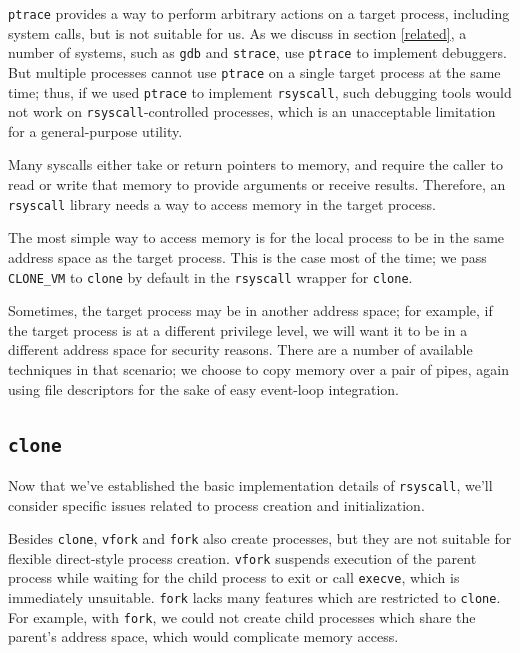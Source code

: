 \documentclass[letterpaper,twocolumn,10pt]{article}
\begin{document}
\texttt{ptrace} provides a way to perform arbitrary actions on a target process,
including system calls,
but is not suitable for us.\cite{ptrace}
As we discuss in section \ref{related}, a number of systems, such as \texttt{gdb} and \texttt{strace},
use \texttt{ptrace} to implement debuggers.
But multiple processes cannot use \texttt{ptrace} on a single target process at the same time;
thus, if we used \texttt{ptrace} to implement \texttt{rsyscall},
such debugging tools would not work on \texttt{rsyscall}-controlled processes,
which is an unacceptable limitation for a general-purpose utility.

Many syscalls either take or return pointers to memory,
and require the caller to read or write that memory to provide arguments or receive results.
Therefore, an \texttt{rsyscall} library needs a way to access memory in the target process.

The most simple way to access memory is for the local process to be in the same address space as the target process.
This is the case most of the time; we pass \verb|CLONE_VM| to \texttt{clone} by default
in the \texttt{rsyscall} wrapper for \texttt{clone}.

Sometimes, the target process may be in another address space;
for example, if the target process is at a different privilege level,
we will want it to be in a different address space for security reasons.\cite{vfork_dangerous}
There are a number of available techniques in that scenario;
we choose to copy memory over a pair of pipes,
again using file descriptors for the sake of easy event-loop integration.
\subsection{\texttt{clone}}\label{clone}
Now that we've established the basic implementation details of \texttt{rsyscall},
we'll consider specific issues related to process creation and initialization.

Besides \texttt{clone}, \texttt{vfork} and \texttt{fork} also create processes,
but they are not suitable for flexible direct-style process creation.
\texttt{vfork} suspends execution of the parent process
while waiting for the child process to exit or call \texttt{execve},
which is immediately unsuitable.\cite{vfork}
\texttt{fork} lacks many features which are restricted to \texttt{clone}.
For example, with \texttt{fork},
we could not create child processes which share the parent's address space,
which would complicate memory access.
\end{document}
